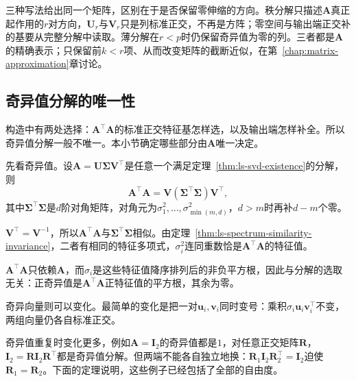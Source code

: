 三种写法给出同一个矩阵，区别在于是否保留零伸缩的方向。秩分解只描述$\bm A$真正起作用的$r$对方向，$\bm U_r$与$\bm V_r$只是列标准正交，不再是方阵；零空间与输出端正交补的基要从完整分解中读取。薄分解在$r<p$时仍保留奇异值为零的列。三者都是$\bm A$的精确表示；只保留前$k<r$项、从而改变矩阵的截断近似，在第~\ref{chap:matrix-approximation}章讨论。

\subsection{奇异值分解的唯一性}
\label{sec:svd-uniqueness}

构造中有两处选择：$\bm A^\top\bm A$的标准正交特征基怎样选，以及输出端怎样补全。所以奇异值分解一般不唯一。本小节确定哪些部分由$\bm A$唯一决定。

先看奇异值。设$\bm A=\bm U\bm\Sigma\bm V^\top$是任意一个满足定理~\ref{thm:ls-svd-existence}的分解，则
\[
 \bm A^\top\bm A=\bm V(\bm\Sigma^\top\bm\Sigma)\bm V^\top ,
\]
其中$\bm\Sigma^\top\bm\Sigma$是$d$阶对角矩阵，对角元为$\sigma_1^2,\ldots,\sigma_{\min(m,d)}^2$，$d>m$时再补$d-m$个零。

$\bm V^\top=\bm V^{-1}$，所以$\bm A^\top\bm A$与$\bm\Sigma^\top\bm\Sigma$相似。由定理~\ref{thm:ls-spectrum-similarity-invariance}，二者有相同的特征多项式，$\sigma_i^2$连同重数恰是$\bm A^\top\bm A$的特征值。

$\bm A^\top\bm A$只依赖$\bm A$，而$\sigma_i$是这些特征值降序排列后的非负平方根，因此与分解的选取无关：正奇异值是$\bm A^\top\bm A$正特征值的平方根，其余为零。

奇异向量则可以变化。最简单的变化是把一对$\bm u_i,\bm v_i$同时变号：乘积$\sigma_i\bm u_i\bm v_i^\top$不变，两组向量仍各自标准正交。

奇异值重复时变化更多，例如$\bm A=\bm I_2$的奇异值都是$1$，对任意正交矩阵$\bm R$，$\bm I_2=\bm R\bm I_2\bm R^\top$都是奇异值分解。但两端不能各自独立地换：$\bm R_1\bm I_2\bm R_2^\top=\bm I_2$迫使$\bm R_1=\bm R_2$。下面的定理说明，这些例子已经包括了全部的自由度。

